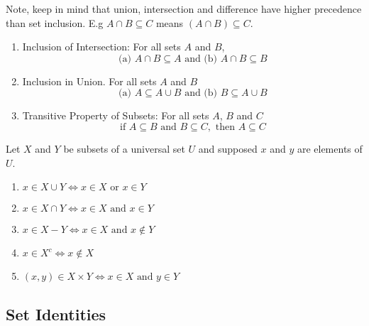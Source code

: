 \documentclass[11pt]{article}
\begin{document}
\begin{definition}\label{def:subset-relations}
    Note, keep in mind that union, intersection and difference have higher precedence
    than set inclusion. E.g $A \cap B \subseteq C$ means $(A \cap B) \subseteq C$.

    \begin{enumerate}
        \item Inclusion of Intersection: For all sets $A$ and $B$,
            \begin{equation*}
                \text{(a) } A \cap B \subseteq A \text{ and (b) } A \cap B \subseteq B
            \end{equation*}
        \item Inclusion in Union. For all sets $A$ and $B$
            \begin{equation*}
                \text{(a) } A \subseteq A \cup B \text{ and (b) } B \subseteq A \cup B
            \end{equation*}
        \item Transitive Property of Subsets: For all sets $A$, $B$ and $C$
            \begin{equation*}
                \text{if } A \subseteq B \text{ and } B \subseteq C, \text{ then } A \subseteq C
            \end{equation*}
    \end{enumerate}
\end{definition}

\begin{definition}\label{def:procedural-set-defs}
    Let $X$ and $Y$ be subsets of a universal set $U$ and supposed $x$ and $y$ are elements of $U$.
    \begin{enumerate}
        \item $x \in X \cup Y \iff x \in X \text{ or } x \in Y$
        \item $x \in X \cap Y \iff x \in X \text{ and } x \in Y$
        \item $x \in X - Y \iff x \in X \text{ and } x \notin Y$
        \item $x \in X^c \iff x \notin X$
        \item $(x,y) \in X \times Y \iff x \in X \text{ and } y \in Y$
    \end{enumerate}
\end{definition}

\subsection{Set Identities}
\end{document}

